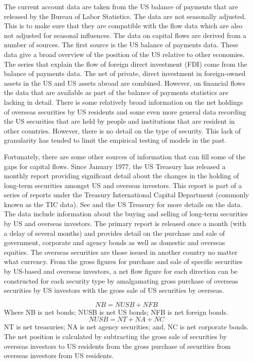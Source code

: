 \documentclass[12pt, a4paper, oneside]{article}\usepackage[]{graphicx}\usepackage[]{color}
\begin{document}
The current account data are taken from the US balance of payments that are released by the Bureau of Labor Statistics.  The data are not seasonally adjusted. This is to make sure that they are compatible with the flow data which are also not adjusted for seasonal influences.   The data on capital flows are derived from a number of sources.  The first source is the US balance of payments data.  These data give a broad overview of the position of the US relative to other economies.  The series that explain the flow of foreign direct investment (FDI) come from the balance of payments data.  The net of private, direct investment in foreign-owned assets in the US and US assets abroad are combined.   However, on financial flows the data that are available as part of the balance of payments statistics are lacking in detail.  There is some relatively broad information on the net holdings of overseas securities by US residents and some even more general data recording the US securities that are held by people and institutions that are resident in other countries.    However, there is no detail on the type of security.  This lack of granularity has tended to limit the empirical testing of models in the past. 
 
Fortunately, there are some other sources of information that can fill some of the gaps for capital flows.  Since January 1977, the US Treasury has released a monthly report providing significant detail about the changes in the holding of long-term securities amongst US and overseas investors. This report is part of a series of reports under the Treasury International Capital Department (commonly known as the TIC data). 
See \citep[p. 29]{Siourounis2004Capital} and the US Treasury \citep{TIC} for more details on the data.
The data include information about the buying and selling of long-term securities by US and overseas investors.  The primary report is released once a month (with a delay of several months) and provides detail on the purchase and sale of government, corporate and agency bonds as well as domestic and overseas equities.  The overseas securities are those issued in another country no matter what currency.  From the gross figures for purchase and sale of specific securities by US-based and overseas investors, a net flow figure for each direction can be constructed for each security type by amalgamating gross purchase of overseas securities by US investors with the gross sale of US securities by overseas.  

\begin{equation}
NB= NUSB + NFB
\end{equation}
Where NB is net bonds; NUSB is net US bonds; NFB is net foreign bonds. 
\begin{equation}
NUSB = NT + NA + NC
\end{equation}
NT is net treasuries; NA is net agency securities; and, NC is net corporate bonds.  The net position is calculated by subtracting the gross sale of securities by overseas investors to US residents from the gross purchase of securities from overseas investors from US residents. 
\end{document}
